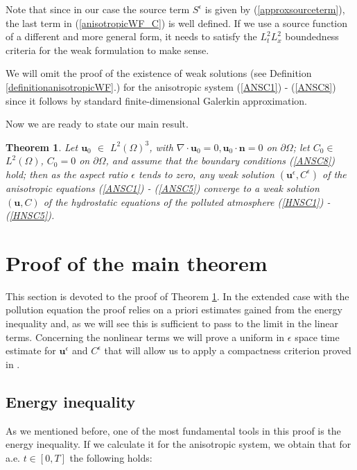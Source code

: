 \documentclass[11pt]{article}
\newtheorem{theorem}{Theorem}
\begin{document}
  Note that since in our case the source term $S^\epsilon$ is given by (\ref{approxsourceterm}), the last term in (\ref{anisotropicWF_C}) is well defined. If we use a source function of a different and more general form, it needs to satisfy the $L_t^2 L_x^2$ boundedness criteria for the weak formulation to make sense.

We will omit the proof of the existence of weak solutions (see Definition \ref{definitionanisotropicWF}.) for the anisotropic system (\ref{ANSC1}) - (\ref{ANSC8}) since it follows by standard finite-dimensional Galerkin approximation.

Now we are ready to state our main result.
  
\begin{theorem} \label{maintheorem}
  Let $\mathbf{u}_0$ $\in$ $L^2 (\Omega)^3$, with $\nabla \cdot \mathbf{u}_0 = 0, \mathbf{u}_0 \cdot \mathbf{n} = 0$ on $\partial \Omega$; let $C_0 \in$ $L^2 (\Omega)$, $C_0 = 0$ on $ \partial \Omega$, and assume that the boundary conditions (\ref{ANSC8}) hold; then as the aspect ratio $\epsilon$ tends to zero, any weak solution $(\mathbf{u}^\epsilon, C^\epsilon)$ of the anisotropic equations (\ref{ANSC1}) - (\ref{ANSC5}) converge to a weak solution $(\mathbf{u}, C)$ of the hydrostatic equations of the polluted atmosphere (\ref{HNSC1}) - (\ref{HNSC5}).
\end{theorem}

\section{Proof of the main theorem} \label{proof}
 
 This section is devoted to the proof of Theorem \ref{maintheorem}. In the extended case with the pollution equation the proof relies on a priori estimates gained from the energy inequality and, as we will see this is sufficient to pass to the limit in the linear terms. Concerning the nonlinear terms we will prove a uniform in $\epsilon$ space time estimate for $\mathbf{u}^\epsilon$ and $C^\epsilon$ that will allow us to apply a compactness criterion proved in \cite{azerad2001mathematical}.

  \subsection{Energy inequality}
  
  As we mentioned before, one of the most fundamental tools in this proof is the energy inequality. If we calculate it for the anisotropic system, we obtain that for a.e. $t \in [0,T]$ the following holds:
  
\end{document}
